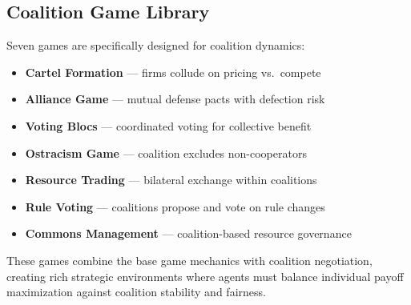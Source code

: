 \subsection{Coalition Game Library}
\label{sec:coalition-games}

Seven games are specifically designed for coalition dynamics:

\begin{itemize}[nosep]
    \item \textbf{Cartel Formation} --- firms collude on pricing vs.\ compete
    \item \textbf{Alliance Game} --- mutual defense pacts with defection risk
    \item \textbf{Voting Blocs} --- coordinated voting for collective benefit
    \item \textbf{Ostracism Game} --- coalition excludes non-cooperators
    \item \textbf{Resource Trading} --- bilateral exchange within coalitions
    \item \textbf{Rule Voting} --- coalitions propose and vote on rule changes
    \item \textbf{Commons Management} --- coalition-based resource governance
\end{itemize}

These games combine the base game mechanics with coalition negotiation,
creating rich strategic environments where agents must balance individual
payoff maximization against coalition stability and fairness.
